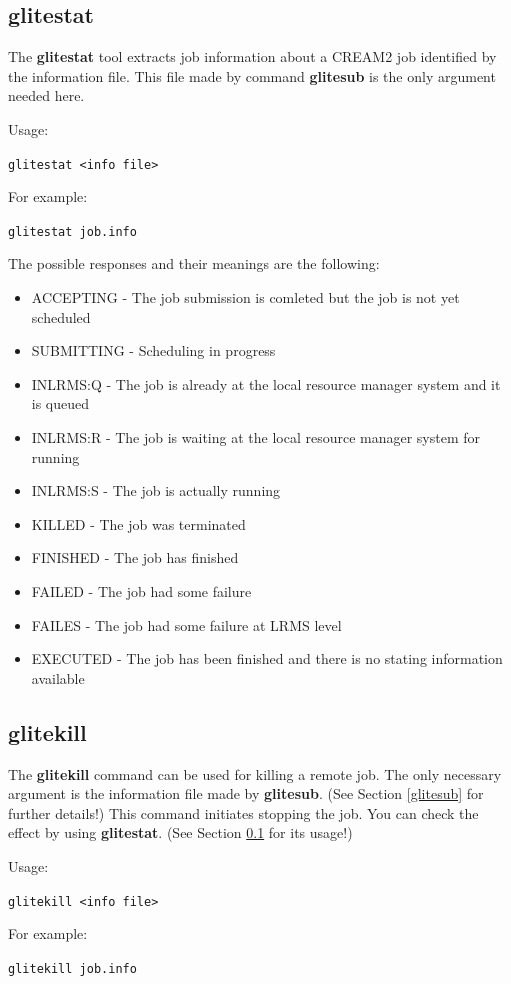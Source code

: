 \documentclass{article}
\begin{document}
\subsection{glitestat}
\label{glitestat}
The \textbf{glitestat} tool extracts job information about a CREAM2 job identified by the information file. This file made by command \textbf{glitesub} is the only argument needed here.\par
Usage:
\begin{shaded}\verb#glitestat <info file>#\end{shaded}
For example:
\begin{shaded}\verb#glitestat job.info#\end{shaded}
The possible responses and their meanings are the following:
\begin{itemize}
\item ACCEPTING - The job submission is comleted but the job is not yet scheduled
\item SUBMITTING - Scheduling in progress
\item INLRMS:Q - The job is already at the local resource manager system and it is queued
\item INLRMS:R - The job is waiting at the local resource manager system for running
\item INLRMS:S - The job is actually running
\item KILLED - The job was terminated
\item FINISHED - The job has finished
\item FAILED - The job had some failure
\item FAILES - The job had some failure at LRMS level
\item EXECUTED - The job has been finished and there is no stating information available
\end{itemize}
\subsection{glitekill}
\label{glitekill}
The \textbf{glitekill} command can be used for killing a remote job. The only necessary argument is the information file made by \textbf{glitesub}. (See Section \ref{glitesub} for further details!) This command initiates stopping the job. You can check the effect by using \textbf{glitestat}. (See Section \ref{glitestat} for its usage!)\par
Usage:
\begin{shaded}\verb#glitekill <info file>#\end{shaded}
For example:
\begin{shaded}\verb#glitekill job.info#\end{shaded}
\end{document}
